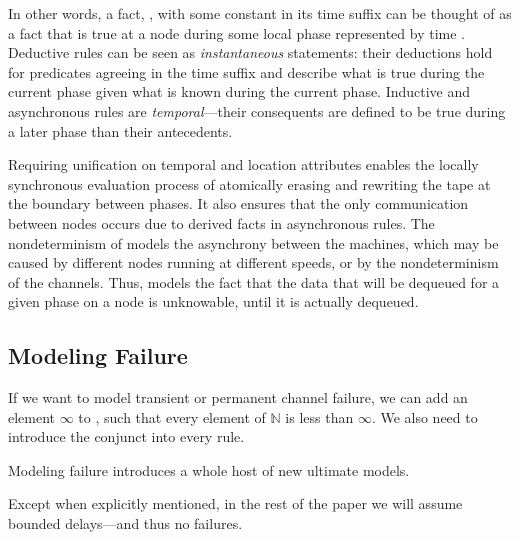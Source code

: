 In other words, a fact, , with some constant  in its time suffix can be thought of as a fact that is true at a node during some local phase represented by time .  Deductive rules can be seen as {\em instantaneous} statements: their deductions hold for predicates agreeing in the time suffix and describe what is true during the current phase given what is known during the current phase. Inductive and asynchronous rules are {\em temporal}---their consequents are defined to be true during a later phase than their antecedents.

Requiring unification on temporal and location attributes enables the locally synchronous evaluation process of atomically erasing and rewriting the tape at the boundary between phases.  It also ensures that the only communication between nodes occurs due to derived facts in asynchronous rules.  The nondeterminism of  models the asynchrony between the machines, which may be caused by different nodes running at different speeds, or by the nondeterminism of the channels. Thus,  models the fact that the data that will be dequeued for a given phase on a node is unknowable, until it is actually dequeued.

\subsection{Modeling Failure}

If we want \lang to model transient or permanent channel failure, we can add an element $\infty$ to , such that every element of $\mathbb{N}$ is less than $\infty$.  We also need to introduce the conjunct  into every \lang rule.

Modeling failure introduces a whole host of new ultimate models. 

Except when explicitly mentioned, in the rest of the paper we will assume bounded delays---and thus no failures.
